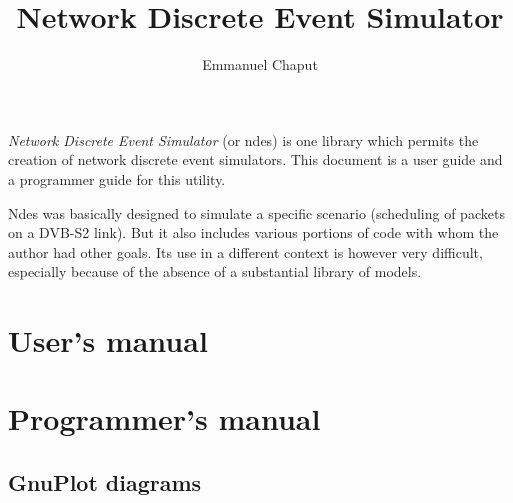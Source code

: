 \documentclass{book}
\title{Network Discrete Event Simulator}
\author{Emmanuel Chaput}
\begin{document}
\maketitle

   
    {\em Network Discrete Event Simulator} (or {\sc ndes}) is one
library which permits the creation of network discrete event simulators. This  document is a user guide and a programmer guide for this utility.

   {\sc Ndes} was basically designed to simulate a
specific scenario (scheduling of packets on a DVB-S2 link). 
But it also includes various portions of code with whom
the author had other goals. Its use in a different context is however very difficult, especially because of the absence of a substantial library of models.


\newpage
\tableofcontents
\newpage

%
\chapter{User's manual}



%

%
\chapter{Programmer's manual}

%


%
%
%

%
\section{GnuPlot diagrams}
\label{section:gnuplot}

%
\end{document}
